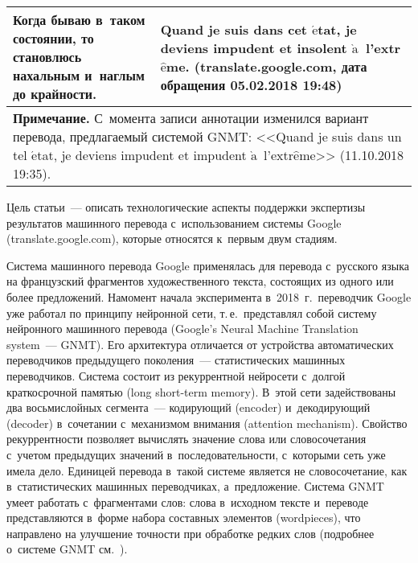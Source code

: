\begin{multicols}{2}
\begin{table*}
\begin{center}
\begin{tabular}{|p{70mm}|p{70mm}|}
\hline
\textbf{Когда} бываю в~таком 
состоянии, \textbf{то} становлюсь 
нахальным и~наглым до крайности. &
\textbf{Quand} je suis dans cet $\acute{\mbox{e}}$tat, 
je deviens impudent et insolent 
$\grave{\mbox{a}}$~l'extr$\hat{\mbox{e}}$me.\newline 
({\sf translate.google.com}, дата обращения 05.02.2018 
19:48)\\
\hline
\multicolumn{2}{p{142mm}}{\footnotesize \hspace*{2mm}\textbf{Примечание.} С~момента записи аннотации 
изменился вариант перевода, предлагаемый системой GNMT: <<Quand je suis dans un tel $\acute{\mbox{e}}$tat, 
je deviens impudent et impudent $\grave{\mbox{a}}$~l'extr$\hat{\mbox{e}}$me>> (11.10.2018 19:35).}
\end{tabular}
\end{center}
\end{table*}

 Цель статьи~--- описать технологические 
аспекты поддержки экспертизы результатов машинного перевода 
с~использованием сис\-те\-мы Google ({\sf translate.google.com}), которые 
относятся к~первым двум стадиям.
  
  Система машинного перевода Google при\-ме\-нялась для перевода с~русского 
языка на фран\-цузский фрагментов художественного текста, состоящих из 
одного или более предложений. На\linebreak момент начала эксперимента в~2018~г.\ 
переводчик Google уже работал по принципу нейронной сети, т.\,е.\ 
пред\-став\-лял собой систему нейронного машинного перевода (Google's Neural 
Machine Translation system~--- GNMT). Его архитектура отличается от 
устройства автоматических переводчиков предыду\-ще\-го поколения~--- 
статистических машинных переводчиков. Система со\-сто\-ит из рекуррентной 
нейросети с~долгой крат\-ко\-сроч\-ной памятью (long short-term memory). В~этой 
сети задействованы два восьмислойных сегмента~--- ко\-ди\-ру\-ющий (encoder) 
и~де\-ко\-ди\-ру\-ющий (decoder) в~сочетании с~механизмом внимания (attention 
mechanism). Свойство рекуррентности поз\-во\-ля\-ет вы\-чис\-лять значение слова или 
словосочетания с~учетом предыду\-щих значений в~последовательности, 
с~которыми сеть уже имела дело. Единицей перевода в~такой системе является 
не словосочетание, как в~статистических машинных переводчиках, 
а~предложение. Система GNMT умеет работать с~фрагментами слов: слова 
в~исходном тексте и~переводе представляются в~форме набора составных 
элементов (wordpieces), что направлено на улучшение точности при обработке 
редких слов (подробнее о~системе GNMT см.~\cite{10-gz, 11-gz}).
  

\end{multicols}
